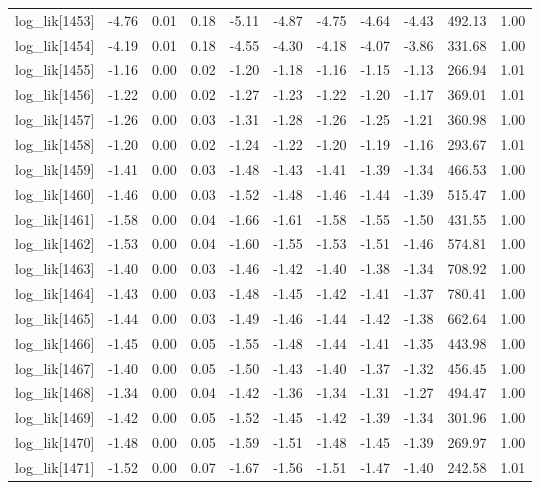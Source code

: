 \begin{table}[ht]
\begin{tabular}{rrrrrrrrrrr}
  log\_lik[1453] & -4.76 & 0.01 & 0.18 & -5.11 & -4.87 & -4.75 & -4.64 & -4.43 & 492.13 & 1.00 \\ 
  log\_lik[1454] & -4.19 & 0.01 & 0.18 & -4.55 & -4.30 & -4.18 & -4.07 & -3.86 & 331.68 & 1.00 \\ 
  log\_lik[1455] & -1.16 & 0.00 & 0.02 & -1.20 & -1.18 & -1.16 & -1.15 & -1.13 & 266.94 & 1.01 \\ 
  log\_lik[1456] & -1.22 & 0.00 & 0.02 & -1.27 & -1.23 & -1.22 & -1.20 & -1.17 & 369.01 & 1.01 \\ 
  log\_lik[1457] & -1.26 & 0.00 & 0.03 & -1.31 & -1.28 & -1.26 & -1.25 & -1.21 & 360.98 & 1.00 \\ 
  log\_lik[1458] & -1.20 & 0.00 & 0.02 & -1.24 & -1.22 & -1.20 & -1.19 & -1.16 & 293.67 & 1.01 \\ 
  log\_lik[1459] & -1.41 & 0.00 & 0.03 & -1.48 & -1.43 & -1.41 & -1.39 & -1.34 & 466.53 & 1.00 \\ 
  log\_lik[1460] & -1.46 & 0.00 & 0.03 & -1.52 & -1.48 & -1.46 & -1.44 & -1.39 & 515.47 & 1.00 \\ 
  log\_lik[1461] & -1.58 & 0.00 & 0.04 & -1.66 & -1.61 & -1.58 & -1.55 & -1.50 & 431.55 & 1.00 \\ 
  log\_lik[1462] & -1.53 & 0.00 & 0.04 & -1.60 & -1.55 & -1.53 & -1.51 & -1.46 & 574.81 & 1.00 \\ 
  log\_lik[1463] & -1.40 & 0.00 & 0.03 & -1.46 & -1.42 & -1.40 & -1.38 & -1.34 & 708.92 & 1.00 \\ 
  log\_lik[1464] & -1.43 & 0.00 & 0.03 & -1.48 & -1.45 & -1.42 & -1.41 & -1.37 & 780.41 & 1.00 \\ 
  log\_lik[1465] & -1.44 & 0.00 & 0.03 & -1.49 & -1.46 & -1.44 & -1.42 & -1.38 & 662.64 & 1.00 \\ 
  log\_lik[1466] & -1.45 & 0.00 & 0.05 & -1.55 & -1.48 & -1.44 & -1.41 & -1.35 & 443.98 & 1.00 \\ 
  log\_lik[1467] & -1.40 & 0.00 & 0.05 & -1.50 & -1.43 & -1.40 & -1.37 & -1.32 & 456.45 & 1.00 \\ 
  log\_lik[1468] & -1.34 & 0.00 & 0.04 & -1.42 & -1.36 & -1.34 & -1.31 & -1.27 & 494.47 & 1.00 \\ 
  log\_lik[1469] & -1.42 & 0.00 & 0.05 & -1.52 & -1.45 & -1.42 & -1.39 & -1.34 & 301.96 & 1.00 \\ 
  log\_lik[1470] & -1.48 & 0.00 & 0.05 & -1.59 & -1.51 & -1.48 & -1.45 & -1.39 & 269.97 & 1.00 \\ 
  log\_lik[1471] & -1.52 & 0.00 & 0.07 & -1.67 & -1.56 & -1.51 & -1.47 & -1.40 & 242.58 & 1.01 \\ 

\end{tabular}
\end{table}
